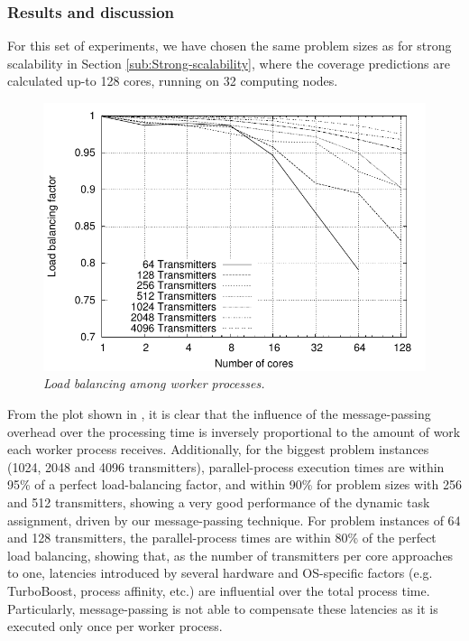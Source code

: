 \subsubsection{Results and discussion}

For this set of experiments, we have chosen the same problem sizes
as for strong scalability in Section \ref{sub:Strong-scalability},
where the coverage predictions are calculated up-to 128 cores, running
on 32 computing nodes.

\begin{figure}
\centering

\includegraphics[width=1\columnwidth]{04-framework_design_and_implementation/img/strong_scaling-load_balancing_plot}

\caption{\textit{\emph{Load balancing among worker processes.\label{fig:load_balancing}}}}
\end{figure}


From the plot shown in , it is clear
that the influence of the message-passing overhead over the processing
time is inversely proportional to the amount of work each worker process
receives. Additionally, for the biggest problem instances (1024, 2048
and 4096 transmitters), parallel-process execution times are within
95\% of a perfect load-balancing factor, and within 90\% for problem
sizes with 256 and 512 transmitters, showing a very good performance
of the dynamic task assignment, driven by our message-passing technique.
For problem instances of 64 and 128 transmitters, the parallel-process
times are within 80\% of the perfect load balancing, showing that,
as the number of transmitters per core approaches to one, latencies
introduced by several hardware and OS-specific factors (e.g. TurboBoost,
process affinity, etc.) are influential over the total process time.
Particularly, message-passing is not able to compensate these latencies
as it is executed only once per worker process.

